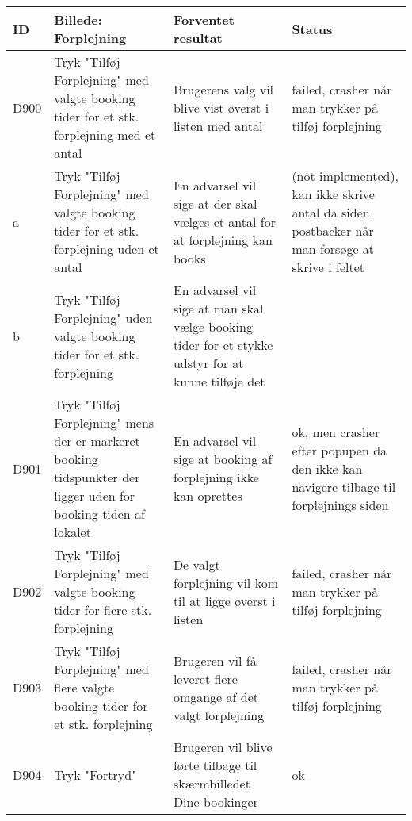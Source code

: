 \begin{tabularx}{\textwidth}{ |X|X|X|X| }
\hline
	ID & Billede: Forplejning  & Forventet resultat & Status\\ 
\hline
	D900 & Tryk "Tilføj Forplejning" med valgte booking tider for et stk. forplejning med et antal & Brugerens valg vil blive vist øverst i listen med antal & failed, crasher når man trykker på tilføj forplejning \\
\hline
	a & Tryk "Tilføj Forplejning" med valgte booking tider for et stk. forplejning uden et antal & En advarsel vil sige at der skal vælges et antal for at forplejning kan books &(not implemented), kan ikke skrive antal da siden postbacker når man forsøge at skrive i feltet \\
\hline
	b & Tryk "Tilføj Forplejning" uden valgte booking tider for et stk. forplejning & En advarsel vil sige at man skal vælge booking tider for et stykke udstyr for at kunne tilføje det & \\
\hline
	D901 & Tryk "Tilføj Forplejning" mens der er markeret booking tidspunkter der ligger uden for booking tiden af lokalet & En advarsel vil sige at booking af forplejning ikke kan oprettes & ok, men crasher efter popupen da den ikke kan navigere tilbage til forplejnings siden \\
\hline
	D902 & Tryk "Tilføj Forplejning" med valgte booking tider for flere stk. forplejning & De valgt forplejning vil kom til at ligge øverst i listen & failed, crasher når man trykker på tilføj forplejning \\
\hline
	D903 & Tryk "Tilføj Forplejning" med flere valgte booking tider for et stk. forplejning & Brugeren vil få leveret flere omgange af det valgt forplejning & failed, crasher når man trykker på tilføj forplejning\\
\hline
	D904 & Tryk "Fortryd" & Brugeren vil blive førte tilbage til skærmbilledet Dine bookinger & ok \\
\hline
\end{tabularx}


